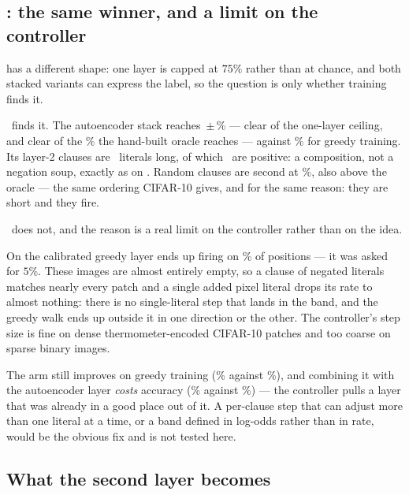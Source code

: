 \subsection{\texorpdfstring{}{xor}: the same winner, and a limit on the controller}
\label{sec:xor}

 has a different shape: one layer is capped at $75\%$ rather than at chance, and both
stacked variants can express the label, so the question is only whether training finds it.

\ideaA\ finds it. The autoencoder stack reaches \synXorAutoAuto\,$\pm$\,\synsdXorAutoAuto{}\%
--- clear of the one-layer ceiling, and clear of the \synXorMctmOracleSixFour{}\% the
hand-built oracle reaches --- against \synXorMctmTask{}\% for greedy training. Its layer-2
clauses are \synltwoXorAutoAuto\ literals long, of which \synltwoposXorAutoAuto\ are positive:
a composition, not a negation soup, exactly as on . Random clauses are second at
\synXorRandomRandom{}\%, also above the oracle --- the same ordering CIFAR-10 gives, and for
the same reason: they are short and they fire.

\ideaB\ does not, and the reason is a real limit on the controller rather than on the idea.
\begin{ttkey}
On  the calibrated greedy layer ends up firing on \synfireXorCalibTask{}\% of
positions --- it was asked for $5\%$. These images are almost entirely empty, so a clause of
negated literals matches nearly every patch and a single added pixel literal drops its rate to
almost nothing: there is no single-literal step that lands in the band, and the greedy walk
ends up outside it in one direction or the other. The controller's step size is fine on dense
thermometer-encoded CIFAR-10 patches and too coarse on sparse binary images.
\end{ttkey}

The arm still improves on greedy training (\synXorCalibTask{}\% against \synXorMctmTask{}\%),
and combining it with the autoencoder layer \emph{costs} accuracy
(\synXorAutoCalibAuto{}\% against \synXorAutoAuto{}\%) --- the controller pulls a layer that
was already in a good place out of it. A per-clause step that can adjust more than one literal
at a time, or a band defined in log-odds rather than in rate, would be the obvious fix and is
not tested here.

\subsection{What the second layer becomes}
\label{sec:l2learned}


